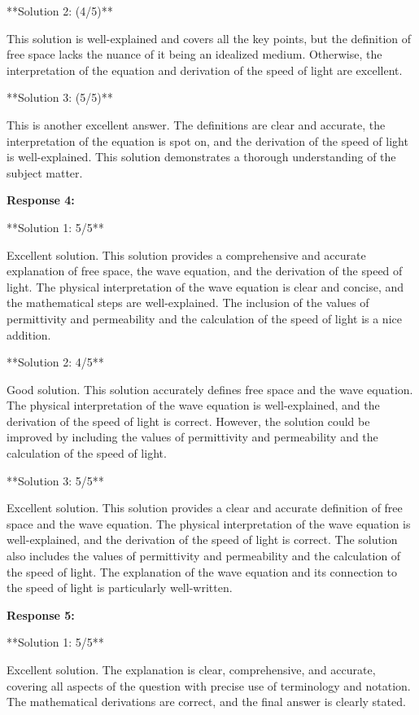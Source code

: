 \documentclass[a4paper,11pt]{article}
\begin{document}
**Solution 2: (4/5)**

This solution is well-explained and covers all the key points, but the definition of free space lacks the nuance of it being an idealized medium. Otherwise, the interpretation of the equation and derivation of the speed of light are excellent.

**Solution 3: (5/5)**

This is another excellent answer. The definitions are clear and accurate, the interpretation of the equation is spot on, and the derivation of the speed of light is well-explained. This solution demonstrates a thorough understanding of the subject matter.

\bigskip    
\textbf{Response 4:}

**Solution 1: 5/5**

Excellent solution. This solution provides a comprehensive and accurate explanation of free space, the wave equation, and the derivation of the speed of light. The physical interpretation of the wave equation is clear and concise, and the mathematical steps are well-explained. The inclusion of the values of permittivity and permeability and the calculation of the speed of light is a nice addition.

**Solution 2: 4/5**

Good solution. This solution accurately defines free space and the wave equation. The physical interpretation of the wave equation is well-explained, and the derivation of the speed of light is correct. However, the solution could be improved by including the values of permittivity and permeability and the calculation of the speed of light.

**Solution 3: 5/5**

Excellent solution. This solution provides a clear and accurate definition of free space and the wave equation. The physical interpretation of the wave equation is well-explained, and the derivation of the speed of light is correct. The solution also includes the values of permittivity and permeability and the calculation of the speed of light. The explanation of the wave equation and its connection to the speed of light is particularly well-written.

\bigskip    
\textbf{Response 5:}

**Solution 1: 5/5**

Excellent solution. The explanation is clear, comprehensive, and accurate, covering all aspects of the question with precise use of terminology and notation. The mathematical derivations are correct, and the final answer is clearly stated.
\end{document}

